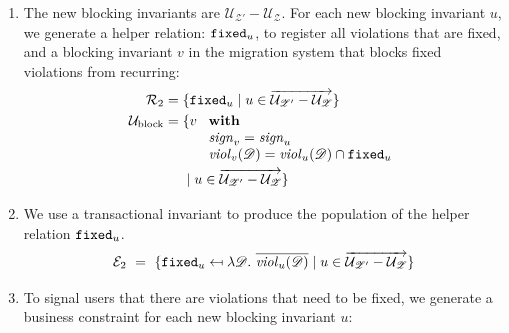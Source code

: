 \documentclass[runningheads]{llncs}
\newcommand{\id}[1]{\text{\it #1\/}}
\newcommand{\viol}[2]{\violC{#1}(#2)}
\newcommand{\violC}[1]{\id{viol}_{#1}}
\newcommand{\sign}[1]{\id{sign}_{#1}}
\newcommand{\rels}{\mathcal{R}}   %
\newcommand{\rules}{\mathcal{U}}
\newcommand{\transactions}{\mathcal{E}}
\newcommand{\dataset}{\mathscr{D}}
\newcommand{\schema}{\mathscr{Z}}
\newcommand{\migrsys}{\mathscr{M}}
\newcommand{\cmpl}[1]{\overline{#1}}
\begin{document}
\begin{enumerate}
\item\label{step3}
   The new blocking invariants are $\rules_{\schema'}-\rules_{\schema}$.
   For each new blocking invariant $u$, we generate a helper relation: ${\tt fixed}_u$, to register all violations that are fixed,
   and a blocking invariant $v$ in the migration system that blocks fixed violations from recurring:
   \begin{align}
      \rels_2={}&\{{\tt fixed}_u\mid u \in\overrightarrow{\rules_{\schema'}-\rules_{\schema}}\}\\
      \rules_\text{block}={}&\{v\ 
      \begin{array}[t]{l}
         \text{\bf with}\\
         \sign{v}=\sign{u}\\
         \viol{v}{\dataset}=\viol{u}{\dataset}\cap{\tt fixed}_u
      \end{array}\label{eqn:blockRule}\\
      &\mid u\in\overrightarrow{\rules_{\schema'}-\rules_{\schema}}\}\notag
   \end{align}
\item\label{step4}
   We use a transactional invariant to produce the population of the helper relation ${\tt fixed}_u$.
   \begin{equation}
     \transactions_2\ =\ \{{\tt fixed}_u\mapsfrom\lambda\dataset.~\cmpl{\viol{u}{\dataset}}\mid u\in\overrightarrow{\rules_{\schema'}-\rules_{\schema}}\}\label{eqn:enforceForRules}
   \end{equation}
\item\label{step5} To signal users that there are violations that need to be fixed, we generate a business constraint for each new blocking invariant $u$:

\end{enumerate}
\end{document}

